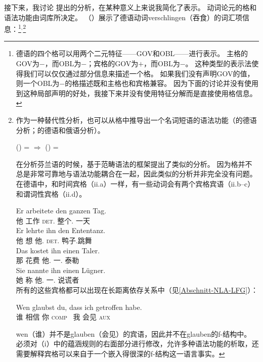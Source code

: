 接下来，我讨论 \citet[\S~2.1.3]{Berman96a-u}提出的分析，在某种意义上来说我简化了表示。
动词论元的格和语法功能由词库所决定\citep[]{Berman96a-u}。
（）展示了德语动词verschlingen（吞食）的词汇项信息：\footnote{%
  德语的四个格可以用两个二元特征——{\small GOV}和{\small OBL}——进行表示\citep[]{Berman96a-u}。
  主格的{\small GOV}为$-$，而{\small OBL}为$-$；宾格的{\small GOV}为$+$，而{\small OBL}为$-$。
  这种类型的表示法使得我们可以仅仅通过部分信息来描述一个格。
  如果我们没有声明{\small GOV}的值，则一个{\small OBL}为$-$的格描述既和主格也和宾格兼容。
  因为下面的讨论并没有使用到这种局部声明的好处，我接下来并没有使用特征分解而是直接使用格信息。
}$^,$\footnote{%
  作为一种替代性分析，也可以从格中推导出一个名词短语的语法功能（\citealp[]{Berman2003a}的德语分析；\citealp[, ]{Bresnan2001a}的德语和俄语分析）。

\ea
\label{Kasus-Implikation-Berman}
\upshape      (\downsp \case) = \mdacc{} $\Rightarrow$ (\upsp \lfgobj) = \down{}
\z

\noindent
   \citet[\S~2.1]{Karttunen89a-u}在分析芬兰语的时候，基于范畴语法\indexcxgc 的框架提出了类似的分析。
  因为格并不总是非常可靠地与语法功能耦合在一起，因此类似的分析并非完全没有问题。
  在德语中，和时间宾格（ii.a）一样，有一些动词会有两个宾格宾语（ii.b--c）和谓词性宾格（ii.d）。

\eal
\ex 
\gll Er arbeitete den ganzen Tag.\\
     他 工作 \textsc{det}.\acc{} 整个.\acc{} 一天\\
\ex 
\gll Er lehrte ihn den Ententanz.\\
     他 想 他.\acc{} \textsc{det}.\acc{} 鸭子.跳舞\\
\ex 
\gll Das kostet ihn einen Taler.\\
     那 花费 他.\acc{} 一.\acc{} 泰勒\\
\ex 
\gll Sie nannte ihn einen Lügner.\\
     她 称 他.\acc{} 一.\acc{} 说谎者\\
\zl
所有的这些宾格都可以出现在长距离依存关系中（见\ref{Abschnitt-NLA-LFG}）：

\ea
\gll Wen glaubst du, dass ich getroffen habe.\\
    谁 相信 你 \textsc{comp}  我 会见 \textsc{aux} \\
\z

\noindent
wen（谁）并不是glauben（会见）的宾语，因此并不在glauben的f-结构中。
必须对（i）中的蕴涵规则的右面部分进行修改，允许多种语法功能的析取，还需要解释宾格可以来自于一个嵌入得很深的f-结构这一语言事实。
}
